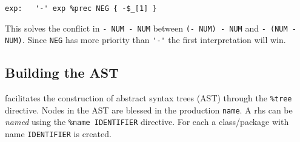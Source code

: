 \begin{verbatim}
exp:   '-' exp %prec NEG { -$_[1] }
\end{verbatim}
This solves  the conflict in \verb|- NUM - NUM|
between \verb|(- NUM) - NUM| and
{\tt - (NUM - NUM)}. Since \verb|NEG| has more
priority than \verb|'-'| the first interpretation 
will win.

\subsection{Building the AST}
 facilitates the construction of 
abstract syntax trees (AST) through the \verb|%tree|
directive. 
Nodes in the AST are blessed in the production
\verb|name|. 
A rhs can be 
{\it named} using the \verb|%name IDENTIFIER| directive. 
For each  a 
class/package with name \verb|IDENTIFIER| is created. 

